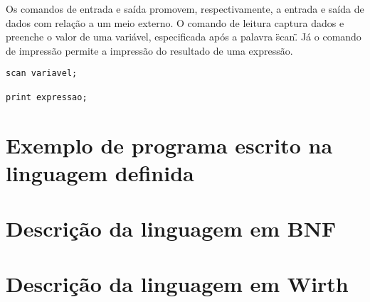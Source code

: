   Os comandos de entrada e saída promovem, respectivamente, a entrada e saída de dados com relação a um meio externo. O comando de leitura captura dados e preenche o valor de uma variável, especificada após a palavra \"scan\". Já o comando de impressão permite a impressão do resultado de uma expressão.

\begin{lstlisting}
scan variavel;

print expressao;
\end{lstlisting}

\section{Exemplo de programa escrito na linguagem definida}



\section{Descrição da linguagem em BNF}



\section{Descrição da linguagem em Wirth}

